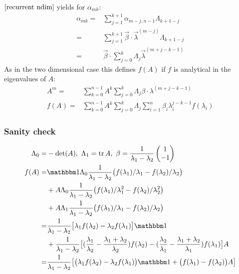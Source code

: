 \documentclass[12pt]{article}
\begin{document}
$\eqref{recurrent ndim}$ yields for $\alpha_{mk}$:
\begin{align}
\alpha_{mk} =& \sum_{j=1}^{k+1} \alpha_{m-j,n-1} \Lambda_{k+1-j} \nonumber\\
=& \sum_{j=1}^{k+1} \vec\beta\cdot\vec\lambda^{(m-j)} \Lambda_{k+1-j} \nonumber\\
=& \vec\beta\cdot \sum_{j=0}^k \Lambda_j \vec\lambda^{(m+j-k-1)}
\end{align}
As in the two dimensional case this defines $f(A)$ if $f$ is analytical in the eigenvalues of $A$:
\begin{align}
A^m =& \sum_{k=0}^{n-1} A^k \sum_{j=0}^k \Lambda_j  \beta \cdot \lambda^{(m+j-k-1)}\\
f(A) =& \sum_{k=0}^{n-1} A^k \sum_{j=0}^k \Lambda_j \sum_{i=1}^n \beta_i \lambda_i^{j-k-1} f(\lambda_i)
\end{align}

\subsubsection*{Sanity check}
\begin{align*}
\Lambda_0 =& -\det(A),\ \Lambda_1 = \tr A,\ \beta = \frac 1 {\lambda_1 - \lambda_2}\begin{pmatrix} 1 \\ -1 \end{pmatrix}\\
f(A) =& \mathbbm 1 \Lambda_0 \frac 1{\lambda_1 - \lambda_2} \big(f(\lambda_1)/\lambda_1 - f(\lambda_2)/\lambda_2 \big)\\
&+ A \Lambda_0 \frac 1{\lambda_1 - \lambda_2} \big(f(\lambda_1)/\lambda_1^2 - f(\lambda_2)/\lambda_2^2 \big)\\
&+ A \Lambda_1 \frac 1{\lambda_1 - \lambda_2} \big(f(\lambda_1)/\lambda_1 - f(\lambda_2)/\lambda_2 \big)\\
=& \frac 1{\lambda_1-\lambda_2}\big[ \lambda_1f(\lambda_2) - \lambda_2f(\lambda_1) \big] \mathbbm 1 \\
&+ \frac 1{\lambda_1-\lambda_2}\big[ (\frac{\lambda_1}{\lambda_2} - \frac{\lambda_1+\lambda_2}{\lambda_2}) f(\lambda_2) - (\frac{\lambda_2}{\lambda_1} - \frac{\lambda_1+\lambda_2}{\lambda_1}) f(\lambda_1) \big] A\\
=& \frac 1{\lambda_1-\lambda_2}\big[ \big( \lambda_1f(\lambda_2) - \lambda_2f(\lambda_1) \big) \mathbbm 1 + \big(f(\lambda_1) - f(\lambda_2)\big) A\big] 
\end{align*}

\end{document}

